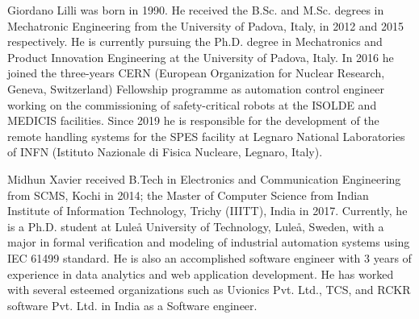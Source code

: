 \documentclass{ieeeojies}
\begin{document}
\newpage


%


\clearpage

\begin{IEEEbiography}{Giordano Lilli} was born in 1990. He received the B.Sc. and M.Sc. degrees in Mechatronic Engineering from the University of Padova, Italy, in 2012 and 2015 respectively. He is currently pursuing the Ph.D. degree in Mechatronics and Product Innovation Engineering at the University of Padova, Italy. In 2016 he joined the three-years CERN (European Organization for Nuclear Research, Geneva, Switzerland) Fellowship programme as automation control engineer working on the commissioning of safety-critical robots at the ISOLDE and MEDICIS facilities. Since 2019 he is responsible for the development of the remote handling systems for the SPES facility at Legnaro National Laboratories of INFN (Istituto Nazionale di Fisica Nucleare, Legnaro, Italy). 
\end{IEEEbiography}

\begin{IEEEbiography}{Midhun Xavier} received B.Tech in Electronics and Communication Engineering from SCMS, Kochi in 2014; the Master of Computer Science from Indian Institute of Information Technology, Trichy (IIITT), India in 2017. Currently, he is a Ph.D. student at Luleå University of Technology, Luleå, Sweden, with a major in formal verification and modeling of industrial automation systems using IEC 61499 standard. He is also an accomplished software engineer with 3 years of experience in data analytics and web application development. He has worked with several esteemed organizations such as Uvionics Pvt. Ltd., TCS, and RCKR software Pvt. Ltd. in India as a Software engineer. 
\end{IEEEbiography}
\end{document}
